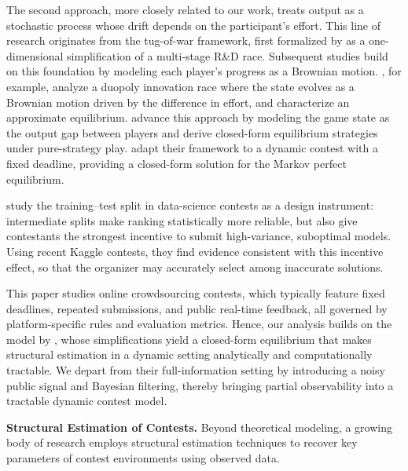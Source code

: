 \documentclass[mnsc]{informs3}
\begin{document}
The second approach, more closely related to our work, treats output as a stochastic process whose drift depends on the participant’s effort.
This line of research originates from the tug-of-war framework, first formalized by \citet{Harris1987Race} as a one-dimensional simplification of a multi-stage R\&D race.
Subsequent studies build on this foundation by modeling each player’s progress as a Brownian motion.
\citet{budd1993Duopoly}, for example, analyze a duopoly innovation race where the state evolves as a Brownian motion driven by the difference in effort, and characterize an approximate equilibrium.
\citet{Moscarini2007Contest} advance this approach by modeling the game state as the output gap between players and derive closed-form equilibrium strategies under pure-strategy play.
\citet{Ryvkin2022Fight} adapt their framework to a dynamic contest with a fixed deadline, providing a closed-form solution for the Markov perfect equilibrium.

{\color{blue}
\citet{huang_2024_designing} study the training–test split in data-science contests as a design instrument: intermediate splits make ranking statistically more reliable, but also give contestants the strongest incentive to submit high-variance, suboptimal models. Using recent Kaggle contests, they find evidence consistent with this incentive effect, so that the organizer may accurately select among inaccurate solutions.
}


This paper studies online crowdsourcing contests, which typically feature fixed deadlines, repeated submissions, and public real-time feedback, all governed by platform-specific rules and evaluation metrics.
Hence, our analysis builds on the model by \citet{Ryvkin2022Fight}, whose simplifications yield a closed-form equilibrium that makes structural estimation in a dynamic setting analytically and computationally tractable.
We depart from their full-information setting by introducing a noisy public signal and Bayesian filtering, thereby bringing partial observability into a tractable dynamic contest model.



\textbf{Structural Estimation of Contests.}
Beyond theoretical modeling, a growing body of research employs structural estimation techniques to recover key parameters of contest environments using observed data.
\end{document}
